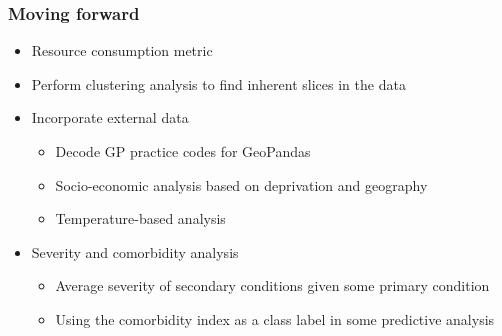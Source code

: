 \documentclass{beamer}
\begin{document}
\begin{frame}
    \frametitle{Moving forward}
    \begin{itemize}
        \pause%
        \item Resource consumption metric
        \pause%
        \item Perform clustering analysis to find inherent slices in the data
        \pause%
        \item Incorporate external data
        \begin{itemize}
            \item Decode GP practice codes for GeoPandas
            \item Socio-economic analysis based on deprivation and geography
            \item Temperature-based analysis
        \end{itemize}
        \pause%
        \item Severity and comorbidity analysis
        \begin{itemize}
            \item Average severity of secondary conditions given some primary
                condition
            \item Using the comorbidity index as a class label in some
                predictive analysis
        \end{itemize}
    \end{itemize}
\end{frame}
\end{document}
